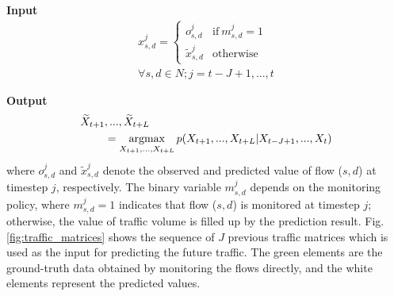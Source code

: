 \textbf{Input}
\begin{equation}
\label{equation:tm_prediction_missing_data}
\begin{matrix}
x_{s,d}^{j}=\left\{\begin{matrix}
o_{s,d}^j & \text{if} \ m_{s,d}^j=1 \\
\widetilde{x}_{s,d}^j & \text{otherwise}
\end{matrix}\right. \\

\forall s, d \in N; j = t - J + 1,...,t 
\end{matrix}
\end{equation}

\textbf{Output}
\begin{equation}
\begin{aligned}
\widetilde{X}_{t+1}&,...,\widetilde{X}_{t+L} \\
	& = \operatorname*{argmax}_{X_{t+1},...,X_{t+L}} p(X_{t+1},...,X_{t+L} |  X_{t-J+1},...,X_{t})
\end{aligned}
\end{equation} 
where $o_{s,d}^j$ and $\widetilde{x}_{s,d}^j$ denote the observed and predicted value of flow ($s,d$) at timestep $j$, respectively. The binary variable $m_{s,d}^j$ depends on the monitoring policy, where $m_{s,d}^j = 1$ indicates that flow ($s,d$) is monitored at timestep $j$; otherwise, the value of traffic volume is filled up by the prediction result. Fig.\ref{fig:traffic_matrices} shows the sequence of $J$ previous traffic matrices which is used as the input for predicting the future traffic. The green elements are the ground-truth data obtained by monitoring the flows directly, and the white elements represent the predicted values.  
